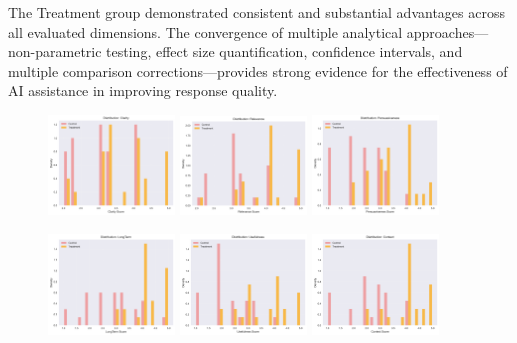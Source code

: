 The Treatment group demonstrated consistent and substantial advantages across all evaluated dimensions. The convergence of multiple analytical approaches—non-parametric testing, effect size quantification, confidence intervals, and multiple comparison corrections—provides strong evidence for the effectiveness of AI assistance in improving response quality.
\begin{figure}[t]
  \centering
  \includegraphics[width=0.3\textwidth]{plots/distribution_clarity.png} \hfill
  \includegraphics[width=0.3\textwidth]{plots/distribution_relevance.png} \hfill
  \includegraphics[width=0.3\textwidth]{plots/distribution_persuasiveness.png}

  \vspace{1em} %

  \includegraphics[width=0.3\textwidth]{plots/distribution_longterm.png} \hfill
  \includegraphics[width=0.3\textwidth]{plots/distribution_usefulness.png} \hfill
  \includegraphics[width=0.3\textwidth]{plots/distribution_context.png}


\end{figure}
